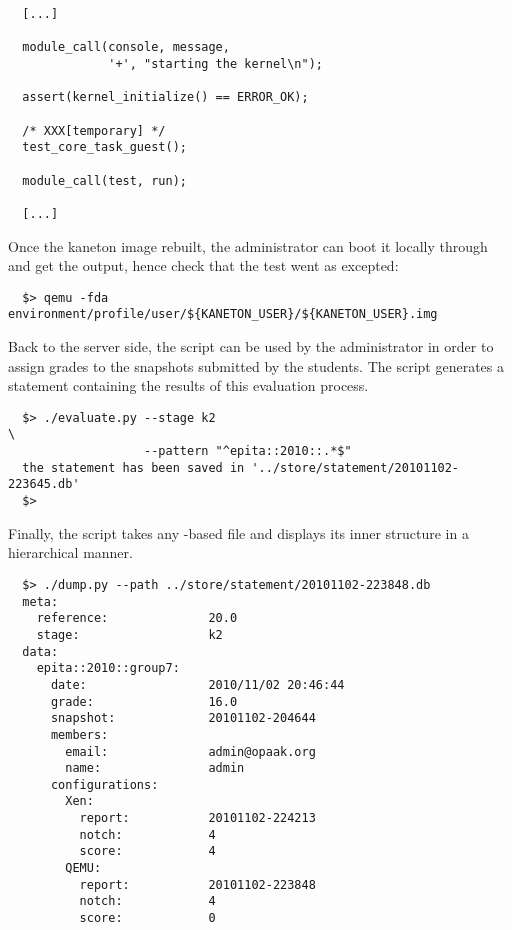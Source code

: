 \begin{verbatim}
  [...]

  module_call(console, message,
              '+', "starting the kernel\n");

  assert(kernel_initialize() == ERROR_OK);

  /* XXX[temporary] */
  test_core_task_guest();

  module_call(test, run);

  [...]
\end{verbatim}

Once the kaneton image rebuilt, the administrator can boot it locally
through  and get the output, hence check that the test went
as excepted:

\begin{verbatim}
  $> qemu -fda environment/profile/user/${KANETON_USER}/${KANETON_USER}.img
\end{verbatim}

Back to the server side, the  script can be used by the
administrator in order to assign grades to the snapshots submitted by the
students. The script generates a statement containing the results of this
evaluation process.

\begin{verbatim}
  $> ./evaluate.py --stage k2                                           \
                   --pattern "^epita::2010::.*$"
  the statement has been saved in '../store/statement/20101102-223645.db'
  $> 
\end{verbatim}

Finally, the  script takes any -based file and
displays its inner structure in a hierarchical manner.

\begin{verbatim}
  $> ./dump.py --path ../store/statement/20101102-223848.db
  meta:
    reference:              20.0
    stage:                  k2
  data:
    epita::2010::group7:
      date:                 2010/11/02 20:46:44
      grade:                16.0
      snapshot:             20101102-204644
      members:
        email:              admin@opaak.org
        name:               admin
      configurations:
        Xen:
          report:           20101102-224213
          notch:            4
          score:            4
        QEMU:
          report:           20101102-223848
          notch:            4
          score:            0
\end{verbatim}

%
%
